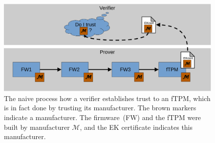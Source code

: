 \begin{figure}[htpb]
  \centering
  \includegraphics[width=1\linewidth]{figures/current_state.pdf}
  \caption{The naive process how a verifier establishes trust to an \ac{fTPM}, which is in fact done by trusting its manufacturer. The brown markers indicate a manufacturer. The firmware~(FW) and the fTPM were built by manufacturer \(\mathcal{M}\), and the EK certificate indicates this manufacturer.}\label{fig:current_state}
\end{figure}
